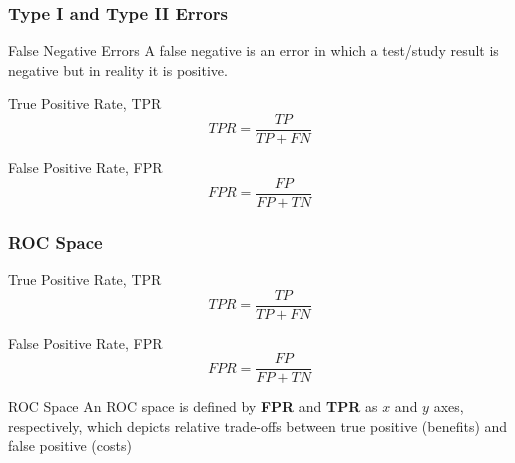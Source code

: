 \documentclass{beamer}
\begin{document}
\begin{frame}
    \frametitle{Type I and Type II Errors}
    \begin{block}{False Negative Errors}
        A false negative is an error in which a test/study result is negative but in reality it is positive.
    \end{block}
\end{frame}



\begin{frame}
    \begin{block}{True Positive Rate, TPR}
        \begin{equation}
            TPR=\frac{TP}{TP+FN}
        \end{equation}
    \end{block}
    
    \begin{block}{False Positive Rate, FPR}
        \begin{equation}
            FPR=\frac{FP}{FP+TN}
        \end{equation}
    \end{block}
    
\end{frame}

\begin{frame}
    \frametitle{ROC Space}
    \begin{block}{True Positive Rate, TPR}
        \begin{equation}
            TPR=\frac{TP}{TP+FN}
        \end{equation}
    \end{block}
    
    \begin{block}{False Positive Rate, FPR}
        \begin{equation}
            FPR=\frac{FP}{FP+TN}
        \end{equation}
    \end{block}
    
    \begin{block}{ROC Space}
        An ROC space is defined by \textbf{FPR} and \textbf{TPR} as $x$ and $y$ axes, respectively, which depicts relative trade-offs between true positive (benefits) and false positive (costs)
    \end{block}
    
\end{frame}
\end{document}
